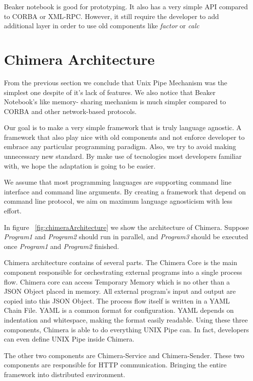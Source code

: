 \documentclass[conference]{IEEEtran}
\begin{document}
Beaker notebook is good for prototyping. It also has a very simple API compared to
CORBA or XML-RPC. However, it still require the developer to add additional layer
in order to use old components like {\it factor} or {\it calc}


\section{Chimera Architecture}

From the previous section we conclude that Unix Pipe Mechanism was the simplest one
despite of it's lack of features. We also notice that Beaker Notebook's like memory-
sharing mechanism is much simpler compared to CORBA and other network-based protocols.

Our goal is to make a very simple framework that is truly language agnostic. A framework
that also play nice with old components and not enforce developer to embrace any 
particular programming paradigm. Also, we try to avoid making unnecessary new standard.
By make use of tecnologies most developers familiar with, we hope the adaptation is
going to be easier.

We assume that most programming languages are supporting command line interface and
command line arguments. By creating a framework that depend on command line protocol,
we aim on maximum language agnosticism with less effort.

In figure ~\ref{fig:chimeraArchitecture} we show the architecture of Chimera. Suppose
{\it Program1} and {\it Program2} should run in parallel, and {\it Program3} should be
executed once {\it Program1} and {\it Program2} finished.

Chimera architecture contains of several parts. The Chimera Core is the main component 
responsible for orchestrating external programs into a single process flow. 
Chimera core can access Temporary Memory which is no other than a JSON Object placed in
memory. All external program's input and output are copied into this JSON Object.
The process flow itself is written in a YAML Chain File. YAML is a common format for
configuration. YAML depends on indentation and whitespace, making the format easily 
readable. Using these three components, Chimera is able to do everything UNIX Pipe can. 
In fact, developers can even define UNIX Pipe inside Chimera.

The other two components are Chimera-Service and Chimera-Sender. These two components
are responsible for HTTP communication. Bringing the entire framework into distributed
environment.
\end{document}
